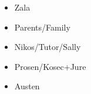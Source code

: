 
\begin{acknowledgements}      


\begin{itemize}
	\item Zala
	\item Parents/Family
	\item Nikos/Tutor/Sally
	\item Prosen/Kosec+Jure
	\item Austen
\end{itemize}


\end{acknowledgements}
